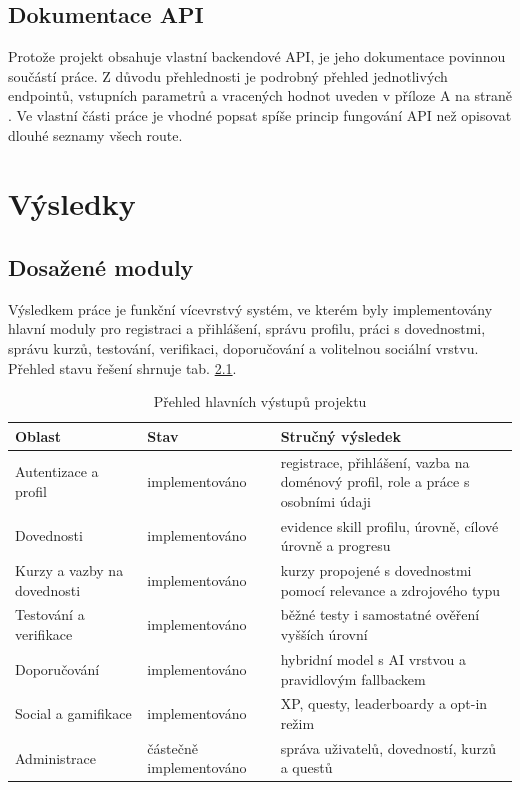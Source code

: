\documentclass[12pt,a4paper]{report}
\begin{document}
\section{Dokumentace API}
Protože projekt obsahuje vlastní backendové API, je jeho dokumentace povinnou součástí práce. Z důvodu přehlednosti je podrobný přehled jednotlivých endpointů, vstupních parametrů a vracených hodnot uveden v příloze A na straně \pageref{appendix-api}. Ve vlastní části práce je vhodné popsat spíše princip fungování API než opisovat dlouhé seznamy všech route.

\chapter{Výsledky}
\section{Dosažené moduly}
Výsledkem práce je funkční vícevrstvý systém, ve kterém byly implementovány hlavní moduly pro registraci a přihlášení, správu profilu, práci s dovednostmi, správu kurzů, testování, verifikaci, doporučování a volitelnou sociální vrstvu. Přehled stavu řešení shrnuje tab. \ref{tab:results}.

\begin{table}[ht]
\centering
\small
\caption{Přehled hlavních výstupů projektu}
\label{tab:results}
\begin{tabularx}{0.95\textwidth}{>{\raggedright\arraybackslash}p{3.2cm} >{\raggedright\arraybackslash}p{2.3cm} >{\raggedright\arraybackslash}X}
\toprule
Oblast & Stav & Stručný výsledek \\
\midrule
Autentizace a profil & implementováno & registrace, přihlášení, vazba na doménový profil, role a práce s osobními údaji \\
Dovednosti & implementováno & evidence skill profilu, úrovně, cílové úrovně a progresu \\
Kurzy a vazby na dovednosti & implementováno & kurzy propojené s dovednostmi pomocí relevance a zdrojového typu \\
Testování a verifikace & implementováno & běžné testy i samostatné ověření vyšších úrovní \\
Doporučování & implementováno & hybridní model s AI vrstvou a pravidlovým fallbackem \\
Social a gamifikace & implementováno & XP, questy, leaderboardy a opt-in režim \\
Administrace & částečně implementováno & správa uživatelů, dovedností, kurzů a questů \\
\bottomrule
\end{tabularx}
\normalsize
\end{table}
\end{document}

